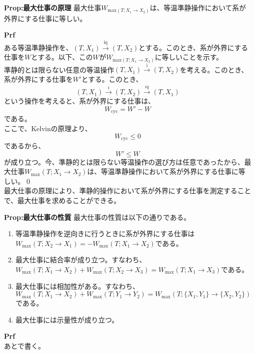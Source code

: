 \documentclass[a4paper,11pt]{jsarticle}
\numberwithin{equation}{section}
\begin{document}
\begin{itembox}[l]{\textbf{Prop:最大仕事の原理}}
    最大仕事$W_{\text{max}(T;X_1\rightarrow X_2)}$は、等温準静操作において系が外界にする仕事に等しい。
\end{itembox}
\textbf{Prf}\\
ある等温準静操作を、$(T,X_1) \xrightarrow{\text{iq}} (T,X_2)$とする。このとき、系が外界にする仕事を$W$とする。以下、この$W$が$W_{\text{max}(T;X_1\rightarrow X_2)}$に等しいことを示す。\\
準静的とは限らない任意の等温操作$(T,X_1) \xrightarrow{\text{i}} (T,X_2)$を考える。このとき、系が外界にする仕事を$W'$とする。このとき、
\begin{equation}
    (T,X_1) \xrightarrow{i} (T,X_2) \xrightarrow{iq} (T,X_1)
\end{equation}
という操作を考えると、系が外界にする仕事は、
\begin{equation}
    W_{\text{cyc}} = W'-W
\end{equation}
である。\\
ここで、Kelvinの原理より、
\begin{equation}
    W_{\text{cyc}} \leq 0
\end{equation}
であるから、
\begin{equation}
    W' \leq W
\end{equation}
が成り立つ。今、準静的とは限らない等温操作の選び方は任意であったから、最大仕事$W_{\text{max}}(T;X_1\rightarrow X_2)$は、等温準静操作において系が外界にする仕事に等しい。\qed\\

最大仕事の原理により、準静的操作において系が外界にする仕事を測定することで、最大仕事を求めることができる。\\

\begin{itembox}[l]{\textbf{Prop:最大仕事の性質}}
    最大仕事の性質は以下の通りである。
    \begin{enumerate}
        \item 等温準静操作を逆向きに行うときに系が外界にする仕事は$W_{\text{max}}(T;X_2\rightarrow X_1)=-W_{\text{max}}(T;X_1\rightarrow X_2)$である。
        \item 最大仕事に結合率が成り立つ。すなわち、$W_{\text{max}}(T;X_1\rightarrow X_2)+W_{\text{max}}(T;X_2\rightarrow X_3) = W_{\text{max}}(T;X_1\rightarrow X_3)$である。
        \item 最大仕事には相加性がある。すなわち、$W_{\text{max}}(T;X_1\rightarrow X_2)+W_{\text{max}}(T;Y_1\rightarrow Y_2) = W_{\text{max}}(T;\{X_1,Y_1\}\rightarrow \{X_2,Y_2\})$である。
        \item 最大仕事には示量性が成り立つ。
    \end{enumerate}
\end{itembox}
\textbf{Prf}\\
あとで書く。\\
\end{document}
